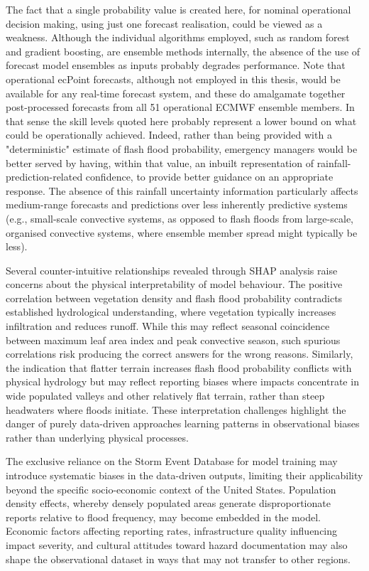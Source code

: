 The fact that a single probability value is created here, for nominal operational decision making, using just one forecast realisation, could be viewed as a weakness. Although the individual algorithms employed, such as random forest and gradient boosting, are ensemble methods internally, the absence of the use of forecast model ensembles as inputs probably degrades performance. Note that operational ecPoint forecasts, although not employed in this thesis, would be available for any real-time forecast system, and these do amalgamate together post-processed forecasts from all 51 operational ECMWF ensemble members. In that sense the skill levels quoted here probably represent a lower bound on what could be operationally achieved. Indeed, rather than being provided with a "deterministic" estimate of flash flood probability, emergency managers would be better served by having, within that value, an inbuilt representation of rainfall-prediction-related confidence, to provide better guidance on an appropriate response. The absence of this rainfall uncertainty information particularly affects medium-range forecasts and predictions over less inherently predictive systems (e.g., small-scale convective systems, as opposed to flash floods from large-scale, organised convective systems, where ensemble member spread might typically be less).

Several counter-intuitive relationships revealed through SHAP analysis raise concerns about the physical interpretability of model behaviour. The positive correlation between vegetation density and flash flood probability contradicts established hydrological understanding, where vegetation typically increases infiltration and reduces runoff. While this may reflect seasonal coincidence between maximum leaf area index and peak convective season, such spurious correlations risk producing the correct answers for the wrong reasons. Similarly, the indication that flatter terrain increases flash flood probability conflicts with physical hydrology but may reflect reporting biases where impacts concentrate in wide populated valleys and other relatively flat terrain, rather than steep headwaters where floods initiate. These interpretation challenges highlight the danger of purely data-driven approaches learning patterns in observational biases rather than underlying physical processes.

The exclusive reliance on the Storm Event Database for model training may introduce systematic biases in the data-driven outputs, limiting their applicability beyond the specific socio-economic context of the United States. Population density effects, whereby densely populated areas generate disproportionate reports relative to flood frequency, may become embedded in the model. Economic factors affecting reporting rates, infrastructure quality influencing impact severity, and cultural attitudes toward hazard documentation may also shape the observational dataset in ways that may not transfer to other regions.

